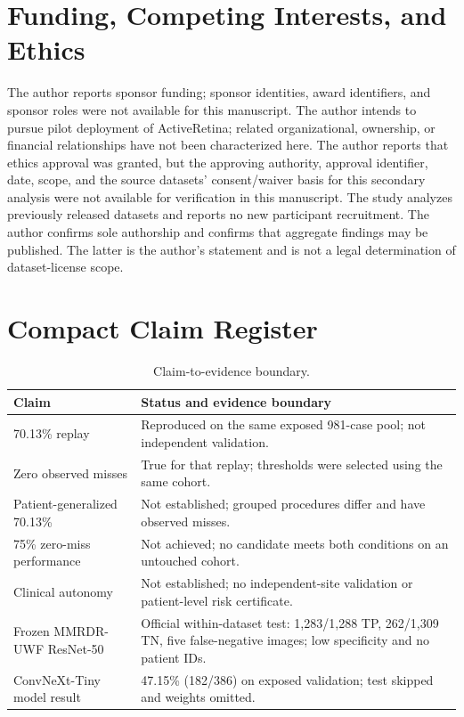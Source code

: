 \documentclass[11pt]{article}
\begin{document}
\section*{Funding, Competing Interests, and Ethics}
The author reports sponsor funding; sponsor identities, award identifiers, and sponsor roles were not available for this manuscript. The author intends to pursue pilot deployment of ActiveRetina; related organizational, ownership, or financial relationships have not been characterized here. The author reports that ethics approval was granted, but the approving authority, approval identifier, date, scope, and the source datasets' consent/waiver basis for this secondary analysis were not available for verification in this manuscript. The study analyzes previously released datasets and reports no new participant recruitment. The author confirms sole authorship and confirms that aggregate findings may be published. The latter is the author's statement and is not a legal determination of dataset-license scope.

\appendix
\section{Compact Claim Register}
\begin{table}[h]
\centering
\caption{Claim-to-evidence boundary.}
\begin{tabularx}{\linewidth}{lX}
\toprule
Claim & Status and evidence boundary \\
\midrule
70.13\% replay & Reproduced on the same exposed 981-case pool; not independent validation.\\
Zero observed misses & True for that replay; thresholds were selected using the same cohort.\\
Patient-generalized 70.13\% & Not established; grouped procedures differ and have observed misses.\\
75\% zero-miss performance & Not achieved; no candidate meets both conditions on an untouched cohort.\\
Clinical autonomy & Not established; no independent-site validation or patient-level risk certificate.\\
Frozen MMRDR-UWF ResNet-50 & Official within-dataset test: 1,283/1,288 TP, 262/1,309 TN, five false-negative images; low specificity and no patient IDs.\\
ConvNeXt-Tiny model result & 47.15\% (182/386) on exposed validation; test skipped and weights omitted.\\
\bottomrule
\end{tabularx}
\end{table}
\end{document}
